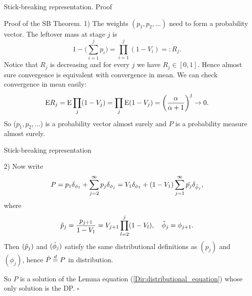\begin{frame}{Stick-breaking representation. Proof}

\alert{Proof of the SB Theorem.}
1) The weights $(p_1, p_2,\ldots)$ need to form a probability vector. The leftover mass at stage $j$ is 
$$
1-\bigg(\sum_{i=1}^j p_i\bigg)=\prod_{i=1}^j(1-V_i) =: R_j.
$$
Notice that $R_j$ is decreasing and for every $j$ we have $R_j\in [0,1]$. Hence almost sure convergence is equivalent with convergence in mean. We can check convergence in mean easily:
$$
\mathrm{E} R_j=\mathrm{E} \prod_j (1-V_j)= \prod_j \mathrm{E}(1-V_j) = \bigg( \frac{\alpha}{\alpha + 1}\bigg)^j \rightarrow 0.
$$
So ($p_1, p_2,\ldots$) is a probability vector almost surely and $P$ is a probability measure almost surely. 

\end{frame}


\begin{frame}{Stick-breaking representation}

2) Now write 
$$
P=p_1\delta_{\phi_1}+\sum_{j=2}^\infty p_j\delta_{\phi_j} = V_1\delta_{\phi_1}+(1-V_1)\sum_{j=1}^\infty \Tilde{p_j}\delta_{\Tilde{\phi}_j},
$$
where 
$$\Tilde{p}_j=\frac{p_{j+1} }{1-V_1}=V_{j+1}\prod_{l=2}^j(1-V_l), \quad \Tilde{\phi}_j=\phi_{j+1}.$$
Then $(\Tilde{p}_j)$ and $(\Tilde{\phi}_j)$ satisfy the same distributional definitions as $(p_j)$ and $(\phi_j)$, hence $\Tilde{P} \overset{d}{=} P$ in distribution. 

So $P$ is a solution of the Lemma equation (\ref{Dir:distributional_equation}) whose only solution is the DP.
\hfill $\square$
\end{frame}






